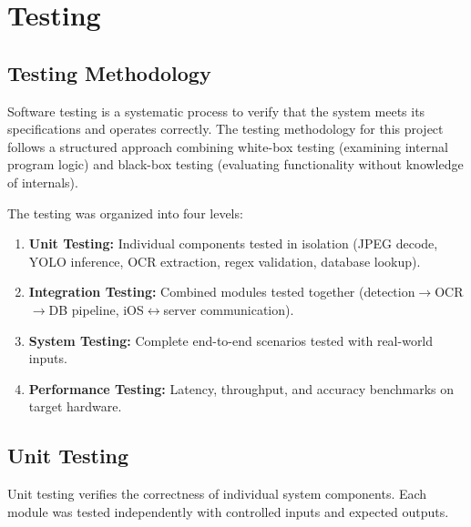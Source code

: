 \chapter{Testing}

\section{Testing Methodology}
Software testing is a systematic process to verify that the system meets its specifications and operates correctly. The testing methodology for this project follows a structured approach combining white-box testing (examining internal program logic) and black-box testing (evaluating functionality without knowledge of internals).

The testing was organized into four levels:
\begin{enumerate}
    \item \textbf{Unit Testing:} Individual components tested in isolation (JPEG decode, YOLO inference, OCR extraction, regex validation, database lookup).
    \item \textbf{Integration Testing:} Combined modules tested together (detection$\to$OCR$\to$DB pipeline, iOS$\leftrightarrow$server communication).
    \item \textbf{System Testing:} Complete end-to-end scenarios tested with real-world inputs.
    \item \textbf{Performance Testing:} Latency, throughput, and accuracy benchmarks on target hardware.
\end{enumerate}

\section{Unit Testing}
Unit testing verifies the correctness of individual system components. Each module was tested independently with controlled inputs and expected outputs.

